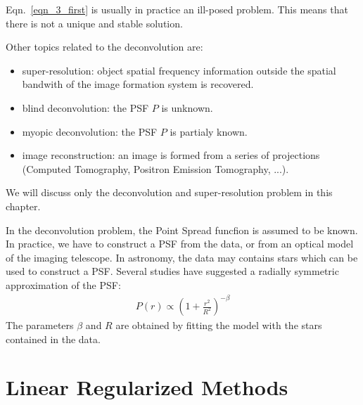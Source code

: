 \documentclass[11pt,a4paper]{article}
\begin{document}
Eqn.\ \ref{eqn_3_first} is usually in practice an ill-posed problem.
This means that there is not a unique and stable solution.  

Other topics related to the deconvolution are:
\begin{itemize}
\item super-resolution: object spatial frequency information 
outside the spatial bandwith of the
image formation system is recovered.
\item blind deconvolution: the PSF $P$ is unknown.
\item myopic deconvolution: the PSF $P$ is partialy known.
\item image reconstruction:
an image is formed from a series of projections (Computed Tomography, 
Positron Emission Tomography, ...).
\end{itemize}
We will discuss only the deconvolution and  super-resolution
problem in this chapter.

In the deconvolution problem, the Point Spread funcfion is assumed to be known.
In practice, we have to construct a PSF from the data, or from an optical model 
of the imaging telescope. In astronomy, the data may contains stars which 
can be used to construct a PSF. Several studies 
\cite{astro:buonanno83,astro:moffat69,astro:djorgovski83,astro:molina92} 
have suggested a radially 
symmetric approximation of the PSF:
\begin{eqnarray}
P(r) \propto (1 + \frac{r^2}{R^2})^{-\beta}
\end{eqnarray}
The parameters $\beta$ and $R$ are obtained by fitting the model 
 with the stars contained in the data.


\section{Linear Regularized Methods}
\end{document}
